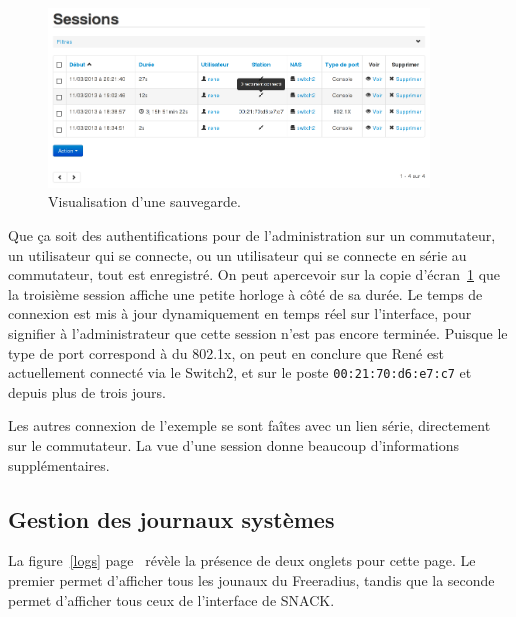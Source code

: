 \begin{figure}[!h]
	\begin{center}
	    \includegraphics[width=0.9\textwidth]{img/sessions.png}
	\end{center}
	\caption{Visualisation d'une sauvegarde.}
	\label{sessions}
\end{figure}

Que ça soit des authentifications pour de l'administration sur un commutateur, un utilisateur qui se connecte, ou un utilisateur qui se connecte en série au commutateur, tout est enregistré. On peut apercevoir sur la copie d'écran~\ref{sessions} que la troisième session affiche une petite horloge à côté de sa durée. Le temps de connexion est mis à jour dynamiquement en temps réel sur l'interface, pour signifier à l'administrateur que cette session n'est pas encore terminée. Puisque le type de port correspond à du 802.1x, on peut en conclure que René est actuellement connecté via le Switch2, et sur le  poste \texttt{00:21:70:d6:e7:c7} et depuis plus de trois jours.

Les autres connexion de l'exemple se sont faîtes avec un lien série, directement sur le commutateur. La vue d'une session donne beaucoup d'informations supplémentaires.

\subsection{Gestion des journaux systèmes}

La figure~\ref{logs} page~\pageref{logs} révèle la présence de deux onglets pour cette page. Le premier permet d'afficher tous les jounaux du Freeradius, tandis que la seconde permet d'afficher tous ceux de l'interface de SNACK.

